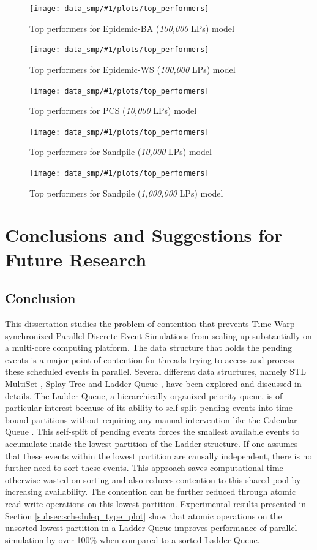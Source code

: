 \documentclass[11pt]{book}
\newcommand{\plotOverallSMP}[3]{
\begin{figure}
  \centering
  \texttt{[image: data\_smp/\#1/plots/top\_performers]}
  \caption{#2}\label{#3}
\end{figure}
}
\begin{document}
\plotOverallSMP{epidemic_100k_ba}
               {Top performers for Epidemic-BA (\emph{100,000} LPs) model}
               {plot:epidemic_100k_ba:consolidated_smp}

\plotOverallSMP{epidemic_100k_ws}
               {Top performers for Epidemic-WS (\emph{100,000} LPs) model}
               {plot:epidemic_100k_ws:consolidated_smp}

\plotOverallSMP{pcs_10k}
               {Top performers for PCS (\emph{10,000} LPs) model}
               {plot:pcs_10k:consolidated_smp}

\plotOverallSMP{sandpile_10k}
               {Top performers for Sandpile (\emph{10,000} LPs) model}
               {plot:sandpile_10k:consolidated_smp}

\plotOverallSMP{sandpile_1m}
               {Top performers for Sandpile (\emph{1,000,000} LPs) model}
               {plot:sandpile_1m:consolidated_smp}



\chapter[Conclusion and Future Research]{Conclusions and Suggestions for Future Research}
\label{chapter:conclude}

\section{Conclusion}

This dissertation studies the problem of contention that prevents Time Warp-synchronized Parallel Discrete
Event Simulations from scaling up substantially on a multi-core computing platform.  The data structure that
holds the pending events is a major point of contention for threads trying to access and process these
scheduled events in parallel.  Several different data structures, namely STL MultiSet \cite{musser-89}, Splay
Tree \cite{sleator-85} and Ladder Queue \cite{tang-05}, have been explored and discussed in details.  The
Ladder Queue, a hierarchically organized priority queue, is of particular interest because of its ability to
self-split pending events into time-bound partitions without requiring any manual intervention like the
Calendar Queue \cite{brown-88}.  This self-split of pending events forces the smallest available events to
accumulate inside the lowest partition of the Ladder structure.  If one assumes that these events within the
lowest partition are causally independent, there is no further need to sort these events.  This approach saves
computational time otherwise wasted on sorting and also reduces contention to this shared pool by increasing
availability.  The contention can be further reduced through atomic read-write operations on this lowest
partition.  Experimental results presented in Section \ref{subsec:scheduleq_type_plot} show that atomic
operations on the unsorted lowest partition in a Ladder Queue improves performance of parallel simulation by
over 100\% when compared to a sorted Ladder Queue.
\end{document}
